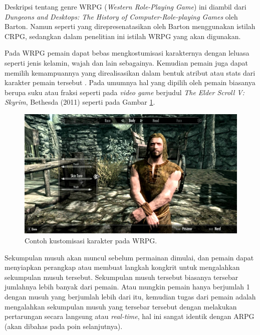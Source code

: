 Deskripsi tentang genre WRPG (\textit{Western Role-Playing Game}) ini diambil dari \textit{Dungeons and Desktops: The History of Computer-Role-playing Games} oleh Barton. Namun seperti yang direpresenatasikan oleh Barton menggunakan istilah CRPG, sedangkan dalam penelitian ini istilah WRPG yang akan digunakan.
\vspace{1ex}

Pada WRPG pemain dapat bebas mengkostumisasi karakternya dengan leluasa seperti jenis kelamin, wajah dan lain sebagainya. Kemudian pemain juga dapat memilih kemampuannya yang direalisasikan dalam bentuk atribut atau stats dari karakter pemain tersebut \citep{barton2019}. Pada umumnya hal yang dipilih oleh pemain biasanya berupa suku atau fraksi seperti pada \textit{video game} berjudul \textit{The Elder Scroll V: Skyrim}, Bethesda (2011) seperti pada Gambar \ref{fig:skyrim}.
\vspace{1ex}

\begin{figure} [!h] \centering
	\includegraphics[scale=0.20]{img/skyrim.jpg}
	\caption{Contoh kustomisasi karakter pada WRPG.}
	\label{fig:skyrim}
\end{figure}

Sekumpulan musuh akan muncul sebelum permainan dimulai, dan pemain dapat menyiapkan perangkap atau membuat langkah kongkrit untuk mengalahkan sekumpulan  musuh tersebut. Sekumpulan musuh tersebut biasanya tersebar jumlahnya lebih banyak dari pemain. Atau mungkin pemain hanya berjumlah 1 dengan musuh yang berjumlah lebih dari itu, kemudian tugas dari pemain adalah mengalahkan sekumpulan musuh yang tersebar tersebut dengan melakukan pertarungan secara langsung atau \textit{real-time}, hal ini sangat identik dengan ARPG (akan dibahas pada poin selanjutnya).
\vspace{1ex}

